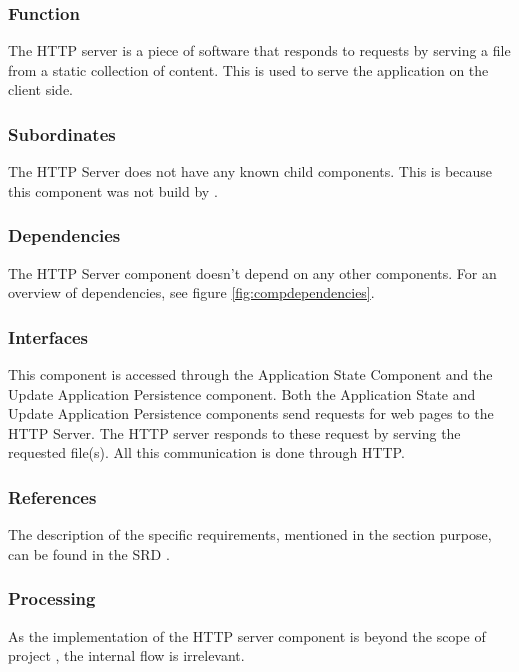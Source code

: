 \noindent {}

\subsubsection*{Function}
The HTTP server is a piece of software that responds to requests by serving a file from a static collection of content. This is used to serve the application on the client side.

\subsubsection*{Subordinates}
The HTTP Server does not have any known child components. This is because this component was not build by \projectauthor.

\subsubsection*{Dependencies}
The HTTP Server component doesn't depend on any other components. For an overview of dependencies, see figure \ref{fig:compdependencies}.

\subsubsection*{Interfaces}
This component is accessed through the Application State Component and the Update Application Persistence component. Both the Application State and Update Application Persistence components send requests for web pages to the HTTP Server. The HTTP server responds to these request by serving the requested file(s). All this communication is done through HTTP.

\subsubsection*{References}
The description of the specific requirements, mentioned in the section purpose, can be found in the SRD \cite{srd}.

\subsubsection*{Processing}
As the implementation of the HTTP server component is beyond the scope of project \projectname, the internal flow is irrelevant.

